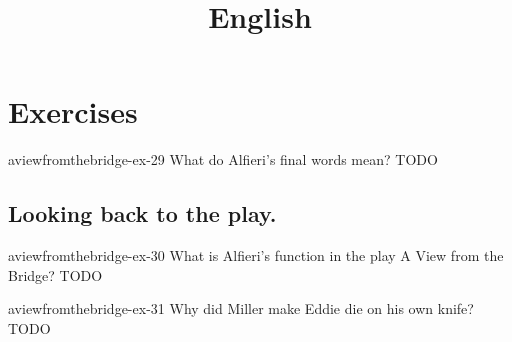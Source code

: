 \documentclass[preview]{standalone}
\begin{document}
\title{English}
\genpage

\section{Exercises}

\begin{snippetexercise}{aviewfromthebridge-ex-29}
    {What do Alfieri's final words mean?}
    TODO
\end{snippetexercise}

\subsection{Looking back to the play.}

\begin{snippetexercise}{aviewfromthebridge-ex-30}
    {What is Alfieri's function in the play A View from the Bridge?}
    TODO
\end{snippetexercise}

\begin{snippetexercise}{aviewfromthebridge-ex-31}
    {Why did Miller make Eddie die on his own knife?}
    TODO
\end{snippetexercise}
\end{document}

